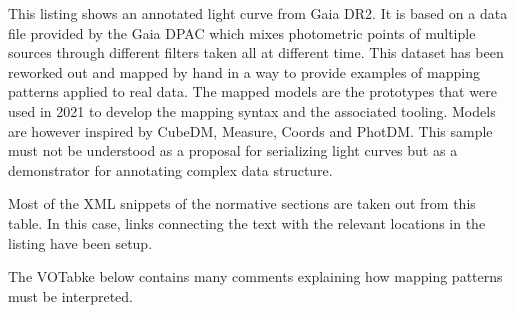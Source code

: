 This listing shows an annotated light curve from Gaia DR2. 
It is based on a data file provided by the Gaia DPAC which mixes photometric points of multiple sources 
through different filters taken all at different time.
This dataset has been reworked out and mapped by hand in a way to provide examples of mapping patterns 
applied to real data.
The mapped models are the prototypes that were used in 2021 to develop the mapping syntax 
and the associated tooling. Models are however inspired by CubeDM, Measure, Coords and PhotDM.
This sample must not be understood as a proposal for serializing light curves but as a demonstrator for annotating complex
data structure.

Most of the XML snippets of the normative sections are taken out from this table. 
In this case, links connecting the text with the relevant locations in the listing have been setup.

The VOTabke below contains many comments explaining how mapping patterns must be interpreted.


